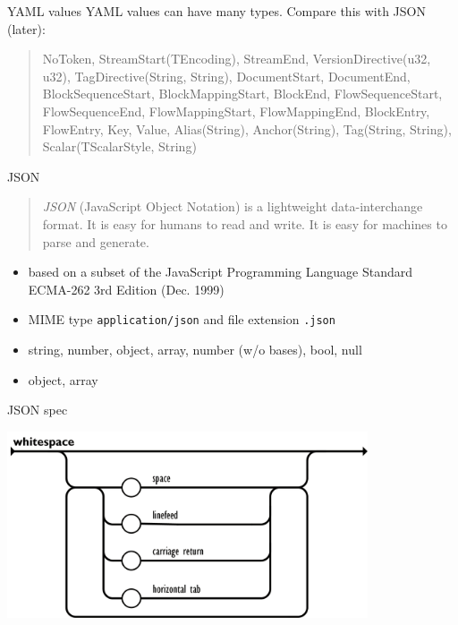 \documentclass{beamer}
\begin{document}
\begin{frame}[fragile]{YAML values}
  YAML values can have many types. Compare this with JSON (later):

  \begin{quote}
    NoToken, 
    StreamStart(TEncoding), 
    StreamEnd, 
    VersionDirective(u32, u32), 
    TagDirective(String, String), 
    DocumentStart, 
    DocumentEnd, 
    BlockSequenceStart, 
    BlockMappingStart, 
    BlockEnd, 
    FlowSequenceStart, 
    FlowSequenceEnd, 
    FlowMappingStart, 
    FlowMappingEnd, 
    BlockEntry, 
    FlowEntry, 
    Key, 
    Value, 
    Alias(String), 
    Anchor(String), 
    Tag(String, String), 
    Scalar(TScalarStyle, String)
  \end{quote}
\end{frame}

\begin{frame}[fragile]{JSON}
  \begin{quote}
    \emph{JSON} (JavaScript Object Notation) is a lightweight data-interchange format. It is easy for humans to read and write. It is easy for machines to parse and generate.
  \end{quote}

  \begin{itemize}
    \item based on a subset of the JavaScript Programming Language Standard ECMA-262 3rd Edition (Dec. 1999)
    \item MIME type \texttt{application/json} and file extension \texttt{.json}
    \item string, number, object, array, number (w/o bases), bool, null
    \item object, array
  \end{itemize}
\end{frame}

\begin{frame}[fragile]{JSON spec}
  \begin{center}
    \includegraphics[width=0.8\textwidth]{images/json-whitespace.png}
  \end{center}
\end{frame}
\end{document}

